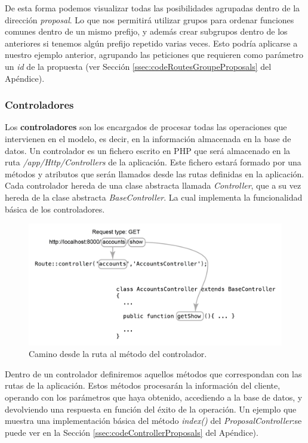 De esta forma podemos visualizar todas las posibilidades agrupadas dentro de la dirección \textit{proposal}. Lo que nos permitirá utilizar grupos para ordenar funciones comunes dentro de un mismo prefijo, y además crear subgrupos dentro de los anteriores si tenemos algún prefijo repetido varias veces. Esto podría aplicarse a nuestro ejemplo anterior, agrupando las peticiones que requieren como parámetro un \textit{id} de la propuesta (ver Sección \ref{ssec:codeRoutesGroupeProposals} del Apéndice).

\subsubsection{Controladores}

Los \textbf{controladores} son los encargados de procesar todas las operaciones que intervienen en el modelo, es decir, en la información almacenada en la base de datos. Un controlador es un fichero escrito en PHP que será almacenado en la ruta \textit{/app/Http/Controllers} de la aplicación. Este fichero estará formado por una métodos y atributos que serán llamados desde las rutas definidas en la aplicación. Cada controlador hereda de una clase abstracta llamada \textit{Controller}, que a su vez hereda de la clase abstracta \textit{BaseController}. La cual implementa la funcionalidad básica de los controladores.

\begin{figure}[!]
\centering
\includegraphics[keepaspectratio, scale=1]{Media/Captures/getDiagramMethod.png}
\caption{Camino desde la ruta al método del controlador.}
\label{fig:laravelArch}
\end{figure}

Dentro de un controlador definiremos aquellos métodos que correspondan con las rutas de la aplicación. Estos métodos procesarán la información del cliente, operando con los parámetros que haya obtenido, accediendo a la base de datos, y devolviendo una respuesta en función del éxito de la operación. Un ejemplo que muestra una implementación básica del método \textit{index()} del \textit{ProposalController}:se puede ver en la Sección \ref{ssec:codeControllerProposals} del Apéndice).

